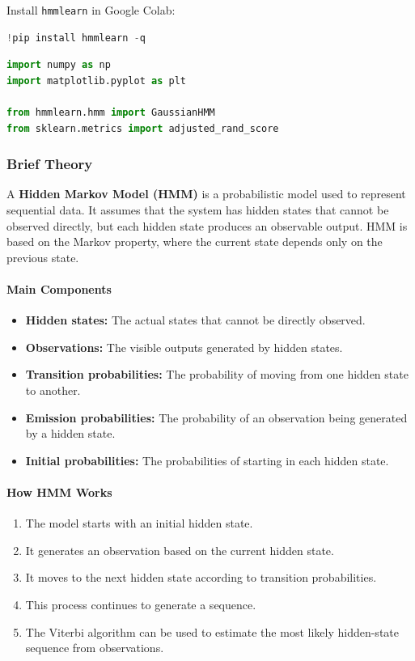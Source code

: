 \documentclass[a4paper,11pt]{article}
\begin{document}
\begin{itemize}
Install \texttt{hmmlearn} in Google Colab:
\begin{lstlisting}[language=Python, caption={Install hmmlearn}]
!pip install hmmlearn -q
\end{lstlisting}

\begin{lstlisting}[language=Python, caption={Required Imports}]
import numpy as np
import matplotlib.pyplot as plt

from hmmlearn.hmm import GaussianHMM
from sklearn.metrics import adjusted_rand_score
\end{lstlisting}

\subsubsection{Brief Theory}
A \textbf{Hidden Markov Model (HMM)} is a probabilistic model used to represent sequential data. It assumes that the system has hidden states that cannot be observed directly, but each hidden state produces an observable output. HMM is based on the Markov property, where the current state depends only on the previous state.

\paragraph{Main Components}
\begin{itemize}
    \item \textbf{Hidden states:} The actual states that cannot be directly observed.
    \item \textbf{Observations:} The visible outputs generated by hidden states.
    \item \textbf{Transition probabilities:} The probability of moving from one hidden state to another.
    \item \textbf{Emission probabilities:} The probability of an observation being generated by a hidden state.
    \item \textbf{Initial probabilities:} The probabilities of starting in each hidden state.
\end{itemize}

\paragraph{How HMM Works}
\begin{enumerate}
    \item The model starts with an initial hidden state.
    \item It generates an observation based on the current hidden state.
    \item It moves to the next hidden state according to transition probabilities.
    \item This process continues to generate a sequence.
    \item The Viterbi algorithm can be used to estimate the most likely hidden-state sequence from observations.
\end{enumerate}


\end{itemize}
\end{document}
